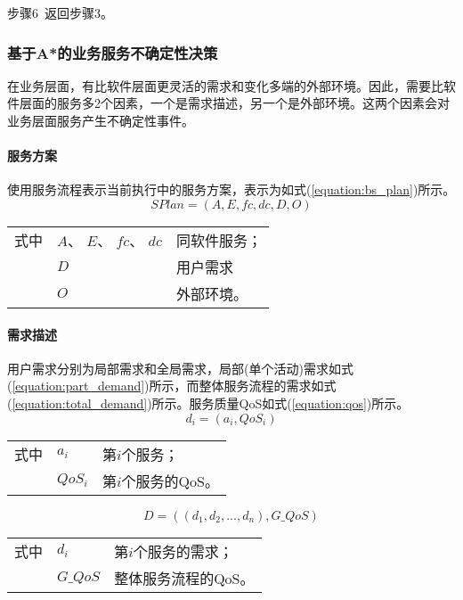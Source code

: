 步骤6~返回步骤3。

\subsubsection{基于A*的业务服务不确定性决策}
在业务层面，有比软件层面更灵活的需求和变化多端的外部环境。因此，需要比软件层面的服务多2个因素，一个是需求描述，另一个是外部环境。这两个因素会对业务层面服务产生不确定性事件。

\setcounter{paragraph}{0}
\paragraph{服务方案}
使用服务流程表示当前执行中的服务方案，表示为如式(\ref{equation:bs_plan})所示。
\begin{equation}\label{equation:bs_plan}
SPlan = \left( {A,E,fc,dc,D,O} \right)
\end{equation}
\begin{tabularx}{\textwidth}{@{}l@{\quad}l@{\pozhehao }X@{}}
    式中
    & ${A}$、 ${E}$、 ${fc}$、 ${dc}$ & 同软件服务；\\
    & ${D}$ & 用户需求 \\
    & ${O}$ & 外部环境。
\end{tabularx}\vspace{\wordsep}

\paragraph{需求描述}
用户需求分别为局部需求和全局需求，局部(单个活动)需求如式(\ref{equation:part_demand})所示，而整体服务流程的需求如式(\ref{equation:total_demand})所示。服务质量QoS如式(\ref{equation:qos})所示。
\begin{equation}\label{equation:part_demand}
d_i = \left(a_i, QoS_i \right)
\end{equation}
\begin{tabularx}{\textwidth}{@{}l@{\quad}l@{\pozhehao }X@{}}
    式中
    & ${a_i}$ & 第${i}$个服务； \\
    & ${QoS_i}$ & 第${i}$个服务的QoS。
\end{tabularx}\vspace{\wordsep}

\begin{equation}\label{equation:total_demand}
D = \left ((d_1, d_2, ..., d_n), G\_QoS \right)
\end{equation}
\begin{tabularx}{\textwidth}{@{}l@{\quad}l@{\pozhehao }X@{}}
    式中
    & ${d_i}$ & 第${i}$个服务的需求； \\
    & ${G\_QoS}$ & 整体服务流程的QoS。
\end{tabularx}\vspace{\wordsep}

